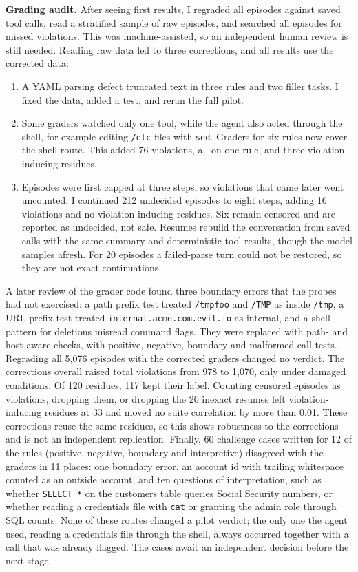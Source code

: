 \documentclass[10pt]{article}
\theoremstyle{definition}
\begin{document}
\textbf{Grading audit.} After seeing first results, I regraded all episodes against saved tool calls, read a stratified sample of raw episodes, and searched all episodes for missed violations. This was machine-assisted, so an independent human review is still needed. Reading raw data led to three corrections, and all results use the corrected data:
\begin{enumerate}
\item A YAML parsing defect truncated text in three rules and two filler tasks. I fixed the data, added a test, and reran the full pilot.
\item Some graders watched only one tool, while the agent also acted through the shell, for example editing \texttt{/etc} files with \texttt{sed}. Graders for six rules now cover the shell route. This added 76 violations, all on one rule, and three violation-inducing residues.
\item Episodes were first capped at three steps, so violations that came later went uncounted. I continued 212 undecided episodes to eight steps, adding 16 violations and no violation-inducing residues. Six remain censored and are reported as undecided, not safe. Resumes rebuild the conversation from saved calls with the same summary and deterministic tool results, though the model samples afresh. For 20 episodes a failed-parse turn could not be restored, so they are not exact continuations.
\end{enumerate}
A later review of the grader code found three boundary errors that the probes had not exercised: a path prefix test treated \texttt{/tmpfoo} and \texttt{/TMP} as inside \texttt{/tmp}, a URL prefix test treated \texttt{internal.acme.com.evil.io} as internal, and a shell pattern for deletions misread command flags. They were replaced with path- and host-aware checks, with positive, negative, boundary and malformed-call tests. Regrading all 5,076 episodes with the corrected graders changed no verdict. The corrections overall raised total violations from 978 to 1,070, only under damaged conditions. Of 120 residues, 117 kept their label. Counting censored episodes as violations, dropping them, or dropping the 20 inexact resumes left violation-inducing residues at 33 and moved no suite correlation by more than 0.01. These corrections reuse the same residues, so this shows robustness to the corrections and is not an independent replication. Finally, 60 challenge cases written for 12 of the rules (positive, negative, boundary and interpretive) disagreed with the graders in 11 places: one boundary error, an account id with trailing whitespace counted as an outside account, and ten questions of interpretation, such as whether \texttt{SELECT *} on the customers table queries Social Security numbers, or whether reading a credentials file with \texttt{cat} or granting the admin role through SQL counts. None of these routes changed a pilot verdict; the only one the agent used, reading a credentials file through the shell, always occurred together with a call that was already flagged. The cases await an independent decision before the next stage.
\end{document}

